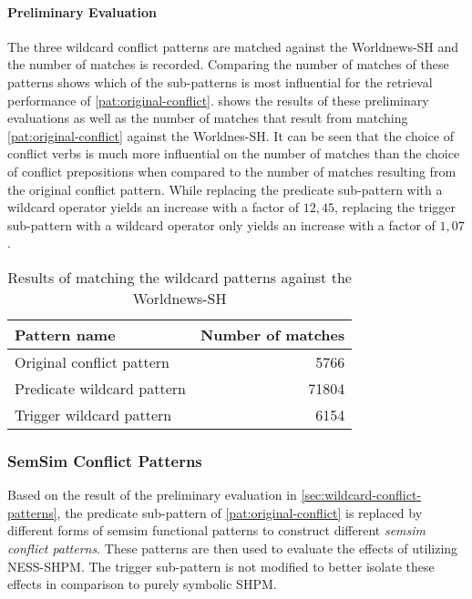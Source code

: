 \documentclass[11pt]{scrreprt}
\begin{document}

\paragraph{Preliminary Evaluation}
The three wildcard conflict patterns are matched against the Worldnews-SH and the number of matches is recorded. Comparing the number of matches of these patterns shows which of the sub-patterns is most influential for the retrieval performance of \cref{pat:original-conflict}.  shows the results of these preliminary evaluations as well as the number of matches that result from matching \cref{pat:original-conflict} against the Worldnes-SH. It can be seen that the choice of conflict verbs is much more influential on the number of matches than the choice of conflict prepositions when compared to the number of matches resulting from the original conflict pattern. While replacing the predicate sub-pattern with a wildcard operator yields an increase with a factor of \(12,45\), replacing the trigger sub-pattern with a wildcard operator only yields an increase with a factor of \(1,07\). 


\begin{table}[h]
\centering
\begin{tabular}{lr}
\toprule
\multicolumn{1}{l}{Pattern name}				& \multicolumn{1}{l}{Number of matches} \\
\midrule
Original conflict pattern					& 5766	\\
Predicate wildcard pattern					& 71804 \\
Trigger wildcard pattern						& 6154	\\
\bottomrule
\end{tabular}
\caption{Results of matching the wildcard patterns against the Worldnews-SH}
\label{tab:wildcard-pattern-evaluation}
\end{table}



\subsubsection{SemSim Conflict Patterns}
Based on the result of the preliminary evaluation in \cref{sec:wildcard-conflict-patterns}, the predicate sub-pattern of \cref{pat:original-conflict} is replaced by different forms of semsim functional patterns to construct different \textit{semsim conflict patterns}. These patterns are then used to evaluate the effects of utilizing NESS-SHPM. The trigger sub-pattern is not modified to better isolate these effects in comparison to purely symbolic SHPM.
\end{document}
